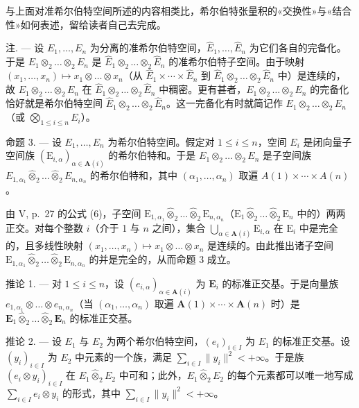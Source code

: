 与上面对准希尔伯特空间所述的内容相类比，希尔伯特张量积的«交换性»与«结合性»如何表述，留给读者自己去完成。

注. --- 设 \(E_{1}, \ldots, E_{n}\) 为分离的准希尔伯特空间，\(\hat{E}_{1}, \ldots, \hat{E}_{n}\) 为它们各自的完备化。于是 \(E_{1} \otimes_{2} \ldots \otimes_{2} E_{n}\) 是 \(\hat{E}_{1} \otimes_{2} \ldots \otimes_{2} \hat{E}_{n}\) 的准希尔伯特子空间。由于映射 \((x_{1}, \ldots, x_{n}) \mapsto x_{1} \otimes \ldots \otimes x_{n}\)（从 \(\hat{E}_{1} \times \cdots \times \hat{E}_{n}\) 到 \(\hat{E}_{1} \otimes_{2} \ldots \otimes_{2} \hat{E}_{n}\) 中）是连续的，故 \(E_{1} \otimes_{2} \ldots \otimes_{2} E_{n}\) 在 \(\hat{E}_{1} \otimes_{2} \ldots \otimes_{2} \hat{E}_{n}\) 中稠密。更有甚者，\(E_{1} \otimes_{2} \ldots \otimes_{2} E_{n}\) 的完备化恰好就是希尔伯特空间 \(\hat{E}_{1} \otimes_{2} \ldots \otimes_{2} \hat{E}_{n}\)。这一完备化有时就简记作 \(E_{1} \otimes_{2} \ldots \otimes_{2} E_{n}\)（或 \(\bigotimes_{1 \leq i \leq n} E_{i}\)）。

命题 3. --- 设 \(E_{1}, \ldots, E_{n}\) 为希尔伯特空间。假定对 \(1 \leqslant i \leqslant n\)，空间 \(E_{i}\) 是闭向量子空间族 \((\mathrm{E}_{i,\alpha})_{\alpha \in \mathbf{A}(i)}\) 的希尔伯特和。于是 \(E_{1} \otimes_{2} \ldots \otimes_{2} E_{n}\) 是子空间族 \(E_{1,\alpha_{1}} \hat{\otimes}_{2} \ldots \hat{\otimes}_{2} E_{n,\alpha_{n}}\) 的希尔伯特和，其中 \((\alpha_{1}, \ldots, \alpha_{n})\) 取遍 \(A(1) \times \cdots \times A(n)\)。

由 V, p.~27 的公式 (6)，子空间 \(\mathrm{E}_{1,\alpha_1}\hat{\otimes}_2\ldots \hat{\otimes}_2\mathrm{E}_{n,\alpha_n}\)（\(\mathrm{E}_1\hat{\otimes}_2\ldots \hat{\otimes}_2\mathrm{E}_n\) 中的）两两正交。对每个整数 \(i\)（介于 1 与 \(n\) 之间），集合 \(\bigcup_{\alpha \in \mathbf{A}(i)}\mathrm{E}_{i,\alpha}\) 在 \(\mathrm{E}_i\) 中是完全的，且多线性映射 \((x_{1},\dots,x_{n})\mapsto x_{1}\otimes \dots \otimes x_{n}\) 是连续的。由此推出诸子空间 \(\mathrm{E}_{1,\alpha_1}\hat{\otimes}_2\ldots \hat{\otimes}_2\mathrm{E}_{n,\alpha_n}\) 的并是完全的，从而命题 3 成立。

推论 1. --- 对 \(1 \leqslant i \leqslant n\)，设 \((e_{i,\alpha})_{\alpha \in \mathbf{A}(i)}\) 为 \(\mathbf{E}_i\) 的标准正交基。于是向量族 \(e_{1,\alpha_1} \otimes \ldots \otimes e_{n,\alpha_n}\)（当 \((\alpha_1, \ldots, \alpha_n)\) 取遍 \(\mathbf{A}(1) \times \cdots \times \mathbf{A}(n)\) 时）是 \(\mathbf{E}_1 \hat{\otimes}_2 \ldots \hat{\otimes}_2 \mathbf{E}_n\) 的标准正交基。

推论 2. --- 设 \(E_{1}\) 与 \(E_{2}\) 为两个希尔伯特空间，\((e_{i})_{i\in I}\) 为 \(E_{1}\) 的标准正交基。设 \((y_{i})_{i\in I}\) 为 \(E_{2}\) 中元素的一个族，满足 \(\sum_{i\in I}\|y_{i}\|^{2}<+\infty\)。于是族 \((e_{i}\otimes y_{i})_{i\in I}\) 在 \(E_{1}\hat{\otimes}_{2}E_{2}\) 中可和；此外，\(E_{1}\hat{\otimes}_{2}E_{2}\) 的每个元素都可以唯一地写成 \(\sum_{i\in I}e_{i}\otimes y_{i}\) 的形式，其中 \(\sum_{i\in I}\|y_{i}\|^{2}<+\infty\)。

